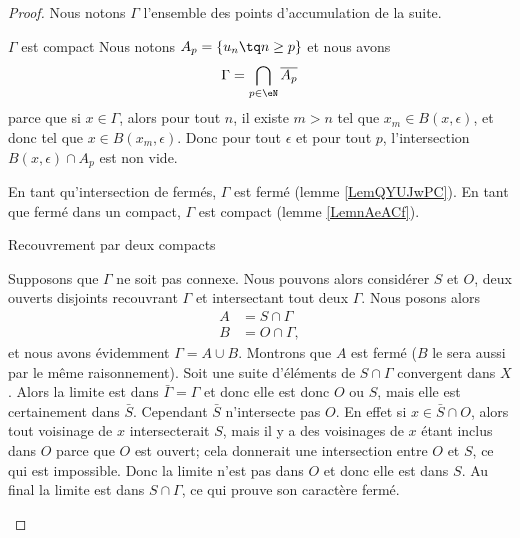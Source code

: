 \begin{proof}
    Nous notons \( \Gamma\) l'ensemble des points d'accumulation de la suite.
    \begin{subproof}
    \item[\( \Gamma\) est compact]
        Nous notons \( A_p=\{ u_n\tq n\geq p \}\) et nous avons
        \begin{equation}
            \Gamma=\bigcap_{p\in \eN}\overline{ A_p }
        \end{equation}
        parce que si \( x\in\Gamma\), alors pour tout \( n\), il existe \( m>n\) tel que \( x_m\in B(x,\epsilon)\), et donc tel que \( x\in B(x_m,\epsilon)\). Donc pour tout \( \epsilon\) et pour tout \( p\), l'intersection \( B(x,\epsilon)\cap A_p\) est non vide.

        En tant qu'intersection de fermés, \( \Gamma\) est fermé (lemme \ref{LemQYUJwPC}). En tant que fermé dans un compact, \( \Gamma\) est compact (lemme \ref{LemnAeACf}).

    \item[Recouvrement par deux compacts]

        Supposons que \( \Gamma\) ne soit pas connexe. Nous pouvons alors considérer \( S\) et \( O\), deux ouverts disjoints recouvrant \( \Gamma\) et intersectant tout deux \( \Gamma\). Nous posons alors
        \begin{subequations}
            \begin{align}
                A&=S\cap\Gamma\\
                B&=O\cap\Gamma,
            \end{align}
        \end{subequations}
        et nous avons évidemment \( \Gamma=A\cup B\). Montrons que \( A\) est fermé (\( B\) le sera aussi par le même raisonnement). Soit une suite d'éléments de \( S\cap \Gamma\) convergent dans \( X\). Alors la limite est dans \( \bar\Gamma=\Gamma\) et donc elle est donc \( O\) ou \( S\), mais elle est certainement dans \( \bar S\). Cependant \( \bar S\) n'intersecte pas \( O\). En effet si \( x\in \bar S\cap O\), alors tout voisinage de \( x\) intersecterait \( S\), mais il y a des voisinages de \( x\) étant inclus dans \( O\) parce que \( O\) est ouvert; cela donnerait une intersection entre \( O\) et \( S\), ce qui est impossible. Donc la limite n'est pas dans \( O\) et donc elle est dans \( S\). Au final la limite est dans \( S\cap \Gamma\), ce qui prouve son caractère fermé. 


\end{subproof}
\end{proof}
